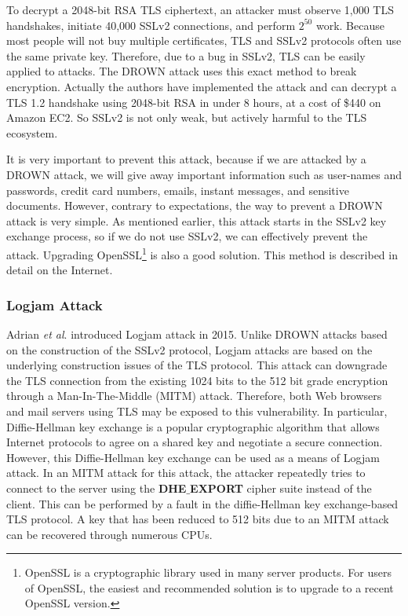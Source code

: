 \documentclass[a4paper]{article}
\begin{document}
To decrypt a 2048-bit RSA TLS ciphertext, an attacker must observe 1,000 TLS handshakes, initiate 40,000 SSLv2 connections, and perform $2^{50}$ work. Because most people will not buy multiple certificates, TLS and SSLv2 protocols often use the same private key. Therefore, due to a bug in SSLv2, TLS can be easily applied to attacks. The DROWN attack uses this exact method to break encryption. Actually the authors have implemented the attack and can decrypt a TLS 1.2 handshake using 2048-bit RSA in under 8 hours, at a cost of \$440 on Amazon EC2. So SSLv2 is not only weak, but actively harmful to the TLS ecosystem.

It is very important to prevent this attack, because if we are attacked by a DROWN attack, we will give away important information such as user-names and passwords, credit card numbers, emails, instant messages, and sensitive documents. However, contrary to expectations, the way to prevent a DROWN attack is very simple. As mentioned earlier, this attack starts in the SSLv2 key exchange process, so if we do not use SSLv2, we can effectively prevent the attack. Upgrading OpenSSL\footnote{OpenSSL is a cryptographic library used in many server products. For users of OpenSSL, the easiest and recommended solution is to upgrade to a recent OpenSSL version.} is also a good solution. This method \cite{Openssl} is described in detail on the Internet.

\subsubsection*{Logjam Attack}
Adrian \textit{et al}.\cite{logjam} introduced Logjam attack in 2015. Unlike DROWN attacks based on the construction of the SSLv2 protocol, Logjam attacks are based on the underlying construction issues of the TLS protocol. This attack can downgrade the TLS connection from the existing 1024 bits to the 512 bit grade encryption through a Man-In-The-Middle (MITM) attack. Therefore, both Web browsers and mail servers using TLS may be exposed to this vulnerability. In particular, Diffie-Hellman key exchange is a popular cryptographic algorithm that allows Internet protocols to agree on a shared key and negotiate a secure connection. However, this Diffie-Hellman key exchange can be used as a means of Logjam attack. In an MITM attack for this attack, the attacker repeatedly tries to connect to the server using the \textbf{DHE$\_$EXPORT} cipher suite instead of the client. This can be performed by a fault in the diffie-Hellman key exchange-based TLS protocol. A key that has been reduced to 512 bits due to an MITM attack can be recovered through numerous CPUs.
\end{document}
